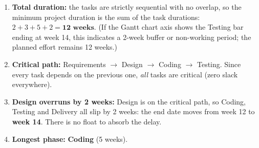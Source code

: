 \documentclass[11pt]{article}
\begin{document}
\begin{corrige}
\begin{enumerate}
    \item \textbf{Total duration:} the tasks are strictly sequential with no overlap, so the minimum project duration is the sum of the task durations: $2 + 3 + 5 + 2 = \textbf{12 weeks}$. (If the Gantt chart axis shows the Testing bar ending at week 14, this indicates a 2-week buffer or non-working period; the planned effort remains 12 weeks.)
    \item \textbf{Critical path:} Requirements $\rightarrow$ Design $\rightarrow$ Coding $\rightarrow$ Testing. Since every task depends on the previous one, \emph{all} tasks are critical (zero slack everywhere).
    \item \textbf{Design overruns by 2 weeks:} Design is on the critical path, so Coding, Testing and Delivery all slip by 2 weeks: the end date moves from week 12 to \textbf{week 14}. There is no float to absorb the delay.
    \item \textbf{Longest phase:} \textbf{Coding} (5 weeks).
\end{enumerate}
\end{corrige}
\end{document}
